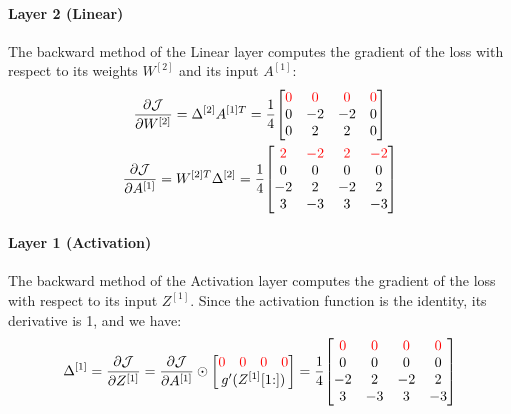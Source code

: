\paragraph{Layer 2 (Linear)} The backward method of the Linear layer computes the gradient of the loss with respect to its weights $W^{[2]}$ and its input $A^{[1]}$:
\begin{gather*}
    \pdv{\mathcal{J}}{W^{[2]}} = \Delta^{[2]} A^{[1]T} = \frac{1}{4} \mqty[
        \color{red} 0 & \color{red} 0 & \color{red} 0 & \color{red} 0 \\
        0 & -2 & -2 & 0 \\
        0 & 2 & 2 & 0 \\
    ]\\
    \pdv{\mathcal{J}}{A^{[1]}} = W^{[2]T} \Delta^{[2]} = \frac{1}{4} \mqty[
        \color{red} 2 & \color{red} -2 & \color{red} 2 & \color{red} -2 \\
        0 & 0 & 0 & 0 \\
        -2 & 2 & -2 & 2 \\
        3 & -3 & 3 & -3 \\
    ]
\end{gather*}

\paragraph{Layer 1 (Activation)} The backward method of the Activation layer computes the gradient of the loss with respect to its input $Z^{[1]}$. Since the activation function is the identity, its derivative is 1, and we have:
\begin{equation*}
    \Delta^{[1]} = \pdv{\mathcal{J}}{Z^{[1]}} = \pdv{\mathcal{J}}{A^{[1]}} \odot \mqty[
        \mqty{\color{red} 0 & \color{red} 0 & \color{red} 0 & \color{red} 0} \\
        g'(Z^{[1]}[1\hspace{-0.6ex}:])
    ] = \frac{1}{4} \mqty[
        \color{red} 0 & \color{red} 0 & \color{red} 0 & \color{red} 0 \\
        0 & 0 & 0 & 0 \\
        -2 & 2 & -2 & 2 \\
        3 & -3 & 3 & -3 \\
    ]
\end{equation*}

